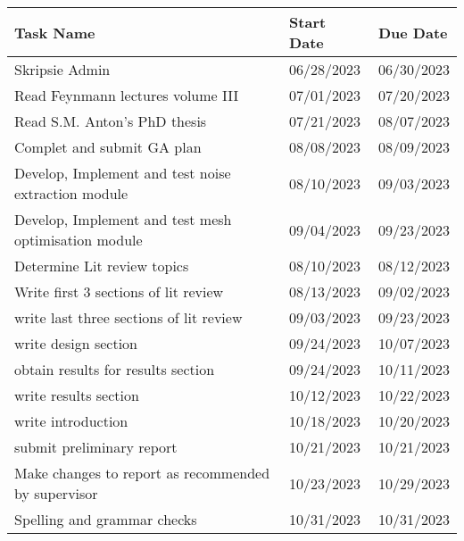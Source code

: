 \begin{table}[H]
    \centering
    \begin{tabular}{lll}
        \hline
        \textbf{Task Name}                                   & \textbf{Start Date} & \textbf{Due Date} \\ \hline
        Skripsie Admin                                       & 06/28/2023          & 06/30/2023        \\
        Read Feynmann lectures volume III                    & 07/01/2023          & 07/20/2023        \\
        Read S.M. Anton's PhD thesis                         & 07/21/2023          & 08/07/2023        \\
        Complet and submit GA plan                           & 08/08/2023          & 08/09/2023        \\
        Develop, Implement and test noise extraction module  & 08/10/2023          & 09/03/2023        \\
        Develop, Implement and test mesh optimisation module & 09/04/2023          & 09/23/2023        \\
        Determine Lit review topics                          & 08/10/2023          & 08/12/2023        \\
        Write first 3 sections of lit review                 & 08/13/2023          & 09/02/2023        \\
        write last three sections of lit review              & 09/03/2023          & 09/23/2023        \\
        write design section                                 & 09/24/2023          & 10/07/2023        \\
        obtain results for results section                   & 09/24/2023          & 10/11/2023        \\
        write results section                                & 10/12/2023          & 10/22/2023        \\
        write introduction                                   & 10/18/2023          & 10/20/2023        \\
        submit preliminary report                            & 10/21/2023          & 10/21/2023        \\
        Make changes to report as recommended by supervisor  & 10/23/2023          & 10/29/2023        \\
        Spelling and grammar checks                          & 10/31/2023          & 10/31/2023        \\

\end{tabular}
\end{table}

